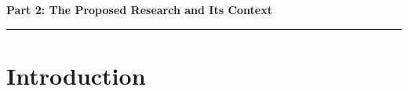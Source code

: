 \documentclass[a4paper,11pt]{article}
\begin{document}
\newpage

\noindent
{\bf \Large Part 2: The Proposed Research and Its Context}

\vspace*{-0.23in}

\begin{center}
\rule{170mm}{.5mm}
\end{center}

\vspace*{-0.3in}

\section{Introduction}\label{sec:intro}

\vspace*{-0.1in} 

 

\end{document}
